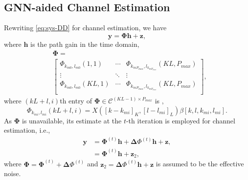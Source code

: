 \documentclass[journal]{IEEEtran}
\begin{document}
\subsection{GNN-aided Channel Estimation}
Rewriting \eqref{eq:sys-DD} for channel estimation, we have
\begin{equation}
\mathbf y = \mathbf\Phi \mathbf h + \mathbf z,
\label{eq:GCHE-sys}
\end{equation}
where $\mathbf h$ is the path gain in the time domain,  
\[
\begin{split}
& \mathbf\Phi = \\
& \begin{bmatrix}
    \Phi_{k_{m0}, l_{m0}}(1, 1) & \cdots & \Phi_{k_{mP_{max}}, l_{k_{mP_{max}}}}(KL, P_{max}) \\ 
	\vdots & \ddots  & \vdots \\  
    \Phi_{k_{m0}, l_{m0}}(KL, 1) & \cdots & \Phi_{k_{mP_{max}}, l_{k_{mP_{max}}}}(KL, P_{max}) \\
\end{bmatrix},
\end{split}
\]
where $(kL+l, i)$th entry of $\mathbf\Phi \in \mathcal{C}^{(KL-1)\times P_{max}}$ is \cite{9785832},
\begin{dmath}
\Phi_{k_{mi}, l_{mi}}(kL+l, i) = X([k-k_{mi}]_K, [l-l_{mi}]_L)\beta[k, l, k_{mi}, l_{mi}].
\end{dmath}
As $\mathbf\Phi$ is unavailable, its estimate at the $t$-th iteration is employed for channel estimation, i.e.,
\begin{equation}
\begin{split}
\mathbf y &= \mathbf\Phi^{(t)} \mathbf h + \mathbf\Delta\Phi^{(t)} \mathbf h  + \mathbf z, \\
&= \mathbf\Phi^{(t)} \mathbf h + \mathbf z_2,
\end{split}
\end{equation}
where $\mathbf\Phi=\mathbf\Phi^{(t)}+\mathbf\Delta\Phi^{(t)}$ and $\mathbf z_2 = \mathbf\Delta\Phi^{(t)} \mathbf h  + \mathbf z$ is assumed to be the effective noise.
\end{document}
